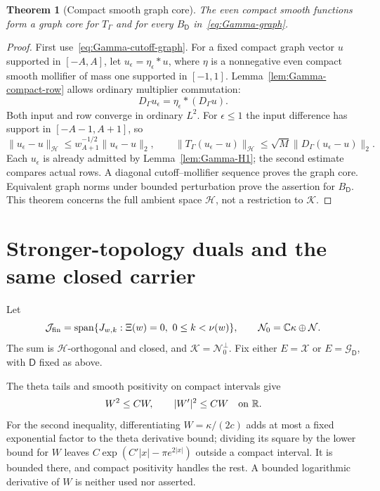 \documentclass[11pt,a4paper]{article}
\numberwithin{equation}{section}
\newtheorem{theorem}{Theorem}[section]
\theoremstyle{definition}
\theoremstyle{remark}
\newcommand{\R}{\mathbb R}
\newcommand{\C}{\mathbb C}
\newcommand{\Hh}{\mathcal H}
\newcommand{\Nn}{\mathcal N}
\newcommand{\Kk}{\mathcal K}
\newcommand{\norm}[1]{\lVert #1\rVert}
\begin{document}
\begin{theorem}[Compact smooth graph core]\label{thm:Gamma-graph-core}
The even compact smooth functions form a graph core for $T_\Gamma$ and for every $B_{\mathsf D}$ in~\eqref{eq:Gamma-graph}.
\end{theorem}
\begin{proof}
First use~\eqref{eq:Gamma-cutoff-graph}. For a fixed compact graph vector $u$ supported in $[-A,A]$, let $u_\epsilon=\eta_\epsilon*u$, where $\eta$ is a nonnegative even compact smooth mollifier of mass one supported in $[-1,1]$. Lemma~\ref{lem:Gamma-compact-row} allows ordinary multiplier commutation:
\[
 D_\Gamma u_\epsilon=\eta_\epsilon*(D_\Gamma u).
\]
Both input and row converge in ordinary $L^2$. For $\epsilon\le1$ the input difference has support in $[-A-1,A+1]$, so
\[
 \norm{u_\epsilon-u}_{\Hh}
 \le w_{A+1}^{-1/2}\norm{u_\epsilon-u}_2,\qquad
 \norm{T_\Gamma(u_\epsilon-u)}_{\Hh}
 \le\sqrt M\norm{D_\Gamma(u_\epsilon-u)}_2.
\]
Each $u_\epsilon$ is already admitted by Lemma~\ref{lem:Gamma-H1}; the second estimate compares actual rows. A diagonal cutoff--mollifier sequence proves the graph core. Equivalent graph norms under bounded perturbation prove the assertion for $B_{\mathsf D}$. This theorem concerns the full ambient space $\Hh$, not a restriction to $\Kk$.
\end{proof}

\section{Stronger-topology duals and the same closed carrier}\label{sec:Gamma-dual-carrier}

Let
\begin{equation}\label{eq:jet-fin}
 \mathcal J_{\rm fin}=\operatorname{span}\{J_{w,k}:\Xi(w)=0,\ 0\le k<\nu(w)\},
 \qquad \Nn_0=\C\kappa\oplus\Nn.
\end{equation}
The sum is $\Hh$-orthogonal and closed, and $\Kk=\Nn_0^\perp$. Fix either $E=\mathcal X$ or $E=\mathcal G_{\mathsf D}$, with $\mathsf D$ fixed as above.

The theta tails and smooth positivity on compact intervals give
\begin{equation}\label{eq:W-derivative-bound}
 W^2\le C W,\qquad |W'|^2\le C W\quad\hbox{on }\R.
\end{equation}
For the second inequality, differentiating $W=\kappa/(2c)$ adds at most a fixed exponential factor to the theta derivative bound; dividing its square by the lower bound for $W$ leaves
$C\exp(C'|x|-\pi e^{2|x|})$ outside a compact interval. It is bounded there, and compact positivity handles the rest. A bounded logarithmic derivative of $W$ is neither used nor asserted.
\end{document}
